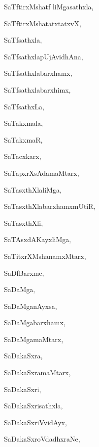 \begin{multicols}{3}
{\noindent
{SaTftirxMshatf liMgasathxla}, \pageref{SaTftirxMshatfliMgasathxla}

\noindent
{SaTftirxMshatatxtatxvX}, \pageref{SaTftirxMshatatxtatxvX}

\noindent
{SaTfsathxla}, \pageref{SaTfsathxla}

\noindent
{SaTfsathxlapUjAvidhAna}, \pageref{SaTfsathxlapUjAvidhAna}

\noindent
{SaTfsathxlabarxhamx}, \pageref{SaTfsathxlabarxhamx}

\noindent
{SaTfsathxlabarxhimx}, \pageref{SaTfsathxlabarxhimx}

\noindent
{SaTfsathxLa}, \pageref{SaTfsathxLa}

\noindent
{SaTakxmala}, \pageref{SaTakxmala}

\noindent
{SaTakxmaR}, \pageref{SaTakxmaR}

\noindent
{SaTacxkarx}, \pageref{SaTacxkarx}

\noindent
{SaTapxrXsAdamaMtarx}, \pageref{SaTapxrXsAdamaMtarx}

\noindent
{SaTasxthXlaliMga}, \pageref{SaTasxthXlaliMga}

\noindent
{SaTasxthXlabarxhamxmUtiR}, \pageref{SaTasxthXlabarxhamxmUtiR}

\noindent
{SaTasxthXli}, \pageref{SaTasxthXli}

\noindent
{SaTAsxdAKayxliMga}, \pageref{SaTAsxdAKayxliMga}

\noindent
{SaTitxrXMshanamxMtarx}, \pageref{SaTitxrXMshanamxMtarx}

\noindent
{SaDfBarxme}, \pageref{SaDfBarxme}

\noindent
{SaDaMga}, \pageref{SaDaMga}

\noindent
{SaDaMganAyxsa}, \pageref{SaDaMganAyxsa}

\noindent
{SaDaMgabarxhamx}, \pageref{SaDaMgabarxhamx}

\noindent
{SaDaMgamaMtarx}, \pageref{SaDaMgamaMtarx}

\noindent
{SaDakaSxra}, \pageref{SaDakaSxra}

\noindent
{SaDakaSxramaMtarx}, \pageref{SaDakaSxramaMtarx}

\noindent
{SaDakaSxri}, \pageref{SaDakaSxri}

\noindent
{SaDakaSxrisathxla}, \pageref{SaDakaSxrisathxla}

\noindent
{SaDakaSxriVvidAyx}, \pageref{SaDakaSxriVvidAyx}

\noindent
{SaDakaSxroVdadhxraNe}, \pageref{SaDakaSxroVdadhxraNe}

}
\end{multicols}
